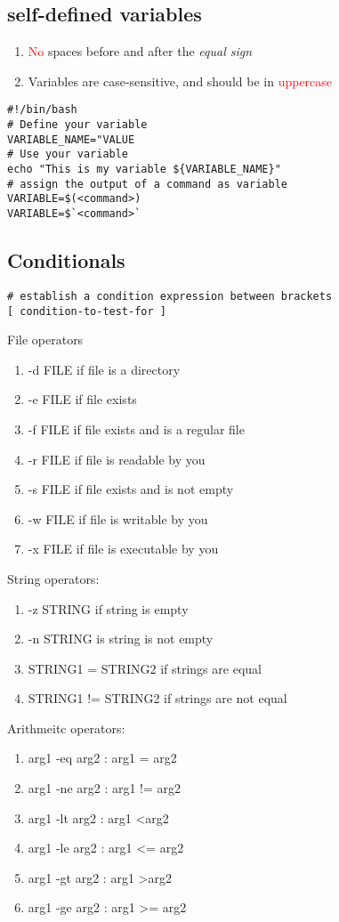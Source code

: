 \documentclass[12pt,a4paper]{article}
\newcommand{\rt}[1]{\textcolor{red}{#1}}
\begin{document}
\subsection{self-defined variables}
\begin{enumerate}
	\item \rt{No} spaces before and after the \textit{equal sign}
	\item Variables are case-sensitive, and should be in \rt{uppercase}
\end{enumerate}
\begin{footnotesize}
\begin{verbatim}
#!/bin/bash
# Define your variable
VARIABLE_NAME="VALUE
# Use your variable
echo "This is my variable ${VARIABLE_NAME}"
# assign the output of a command as variable
VARIABLE=$(<command>)
VARIABLE=$`<command>`
\end{verbatim}
\end{footnotesize}

\subsection{Conditionals}
\begin{footnotesize}
\begin{verbatim}
# establish a condition expression between brackets
[ condition-to-test-for ]
\end{verbatim}
\end{footnotesize}
File operators
\begin{enumerate}
	\item -d FILE if file is a directory
	\item -e FILE if file exists
	\item -f FILE if file exists and is a regular file
	\item -r FILE if file is readable by you
	\item -s FILE if file exists and is not empty
	\item -w FILE if file is writable by you
	\item -x FILE if file is executable by you 
\end{enumerate}
String operators:
\begin{enumerate}
	\item -z STRING if string is empty
	\item -n STRING is string is not empty
	\item STRING1 = STRING2 if strings are equal
	\item STRING1 != STRING2 if strings are not equal
\end{enumerate}
Arithmeitc operators:
\begin{enumerate}
	\item arg1 -eq arg2 : arg1 = arg2
	\item arg1 -ne arg2 : arg1 != arg2
	\item arg1 -lt arg2 : arg1 \textless arg2
	\item arg1 -le arg2 : arg1 \textless= arg2
	\item arg1 -gt arg2 : arg1 \textgreater arg2
	\item arg1 -ge arg2 : arg1 \textgreater= arg2
\end{enumerate}
\end{document}
